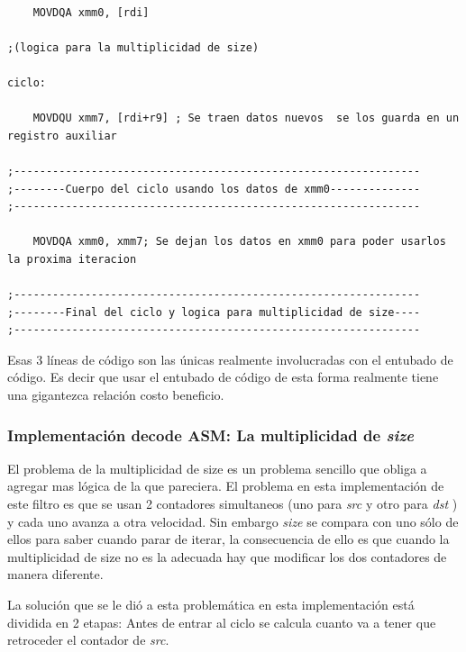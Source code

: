 \begin{verbatim}

	MOVDQA xmm0, [rdi]

;(logica para la multiplicidad de size)

ciclo:

	MOVDQU xmm7, [rdi+r9] ; Se traen datos nuevos  se los guarda en un registro auxiliar

;---------------------------------------------------------------
;--------Cuerpo del ciclo usando los datos de xmm0--------------
;---------------------------------------------------------------

	MOVDQA xmm0, xmm7; Se dejan los datos en xmm0 para poder usarlos la proxima iteracion

;---------------------------------------------------------------
;--------Final del ciclo y logica para multiplicidad de size----
;---------------------------------------------------------------

\end{verbatim}

	Esas 3 líneas de código son las únicas realmente involucradas con
el entubado de código. Es decir que usar el entubado de código de esta forma
realmente tiene una gigantezca relación costo beneficio.



\newpage

\subsubsection{Implementación decode ASM: La multiplicidad de \textit{size}}

	El problema de la multiplicidad de size es un problema sencillo que
obliga a agregar mas lógica de la que pareciera. El problema en esta implementación
de este filtro es que se usan 2 contadores simultaneos (uno para \textit{src} y otro
para \textit{dst} ) y cada uno avanza a otra velocidad. Sin embargo \textit{size} se
compara con uno sólo de ellos para saber cuando parar de iterar, la consecuencia
de ello es que cuando la multiplicidad de size no es la adecuada hay que modificar
los dos contadores de manera diferente.

	La solución que se le dió a esta problemática en esta implementación está
dividida en 2 etapas: Antes de entrar al ciclo se calcula cuanto va a tener
que retroceder el contador de \textit{src}.

